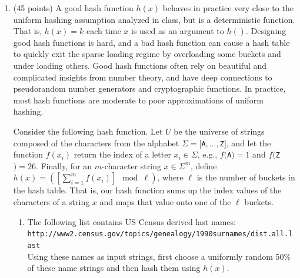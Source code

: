\documentclass[12pt]{article}
\begin{document}
\begin{enumerate}
\begin{enumerate}
	\end{enumerate}

    \item (45 points) A good hash function $h(x)$ behaves in practice very close to the uniform hashing assumption analyzed in 
    class, but is a deterministic function. That is, $h(x)=k$ each time $x$ is used as an argument to $h()$. 
    Designing good hash functions is hard, and a bad hash function can cause a hash table to quickly exit the sparse loading 
    regime by overloading some buckets and under loading others. Good hash functions often rely on beautiful and complicated 
    insights from number theory, and have deep connections to pseudorandom number generators and cryptographic functions. 
    In practice, most hash functions are moderate to poor approximations of uniform hashing.
	
    \smallskip Consider the following hash function. Let $U$ be the universe of strings composed of the characters from the 
    alphabet $\Sigma=[${\tt A}$,\dots,${\tt Z}$]$, and let the function $f(x_{i})$ return the index of a letter $x_{i}\in \Sigma$, 
    e.g., $f(${\tt A}$)=1$ and $f(${\tt Z}$)=26$. Finally, for an $m$-character string $x\in \Sigma^{m}$, define $h(x) = \left(\left[\sum_{i=1}^{m}f(x_{i})\right]\!\! \mod \ell\right)$, 
    where $\ell$ is the number of buckets in the hash table. That is, our hash function sums up the index values of the characters 
    of a string $x$ and maps that value onto one of the $\ell$ buckets.
	
	\begin{enumerate}
    	\item The following list contains US Census derived last names: \\
    	{\tt http://www2.census.gov/topics/genealogy/1990surnames/dist.all.last} \\
        Using these names as input strings, first choose a uniformly random 50\% of these name strings and then hash them 
        using $h(x)$.
    	

\end{enumerate}
\end{enumerate}
\end{document}
